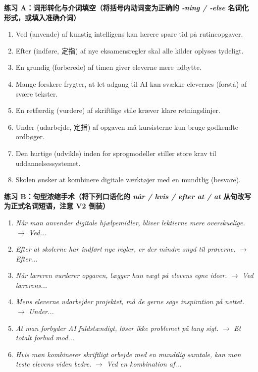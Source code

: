 \textbf{练习 A：词形转化与介词填空（将括号内动词变为正确的 \textit{-ning / -else} 名词化形式，或填入准确介词）}
\begin{enumerate}
  \item Ved \underline{\hspace{2.2cm}} (anvende) af kunstig intelligens kan lærere spare tid på rutineopgaver.
  \item Efter \underline{\hspace{2.2cm}} (indføre, 定指) af nye eksamensregler skal alle kilder oplyses tydeligt.
  \item En grundig \underline{\hspace{2.2cm}} (forberede) af timen giver eleverne mere udbytte.
  \item Mange forskere frygter, at let adgang til AI kan svække elevernes \underline{\hspace{2.2cm}} (forstå) af svære tekster.
  \item En retfærdig \underline{\hspace{2.2cm}} (vurdere) af skriftlige stile kræver klare retningslinjer.
  \item Under \underline{\hspace{2.2cm}} (udarbejde, 定指) af opgaven må kursisterne kun bruge godkendte ordbøger.
  \item Den hurtige \underline{\hspace{2.2cm}} (udvikle) inden for sprogmodeller stiller store krav til uddannelsessystemet.
  \item Skolen ønsker at kombinere digitale værktøjer med en mundtlig \underline{\hspace{2.2cm}} (besvare).
\end{enumerate}

\textbf{练习 B：句型浓缩手术（将下列口语化的 \textit{når / hvis / efter at / at} 从句改写为正式名词短语，注意 V2 倒装）}
\begin{enumerate}
  \item \textit{Når man anvender digitale hjælpemidler, bliver lektierne mere overskuelige.} $\rightarrow$ \textit{Ved...}
  \item \textit{Efter at skolerne har indført nye regler, er der mindre snyd til prøverne.} $\rightarrow$ \textit{Efter...}
  \item \textit{Når læreren vurderer opgaven, lægger hun vægt på elevens egne ideer.} $\rightarrow$ \textit{Ved lærerens...}
  \item \textit{Mens eleverne udarbejder projektet, må de gerne søge inspiration på nettet.} $\rightarrow$ \textit{Under...}
  \item \textit{At man forbyder AI fuldstændigt, løser ikke problemet på lang sigt.} $\rightarrow$ \textit{Et totalt forbud mod...}
  \item \textit{Hvis man kombinerer skriftligt arbejde med en mundtlig samtale, kan man teste elevens viden bedre.} $\rightarrow$ \textit{Ved en kombination af...}
\end{enumerate}

